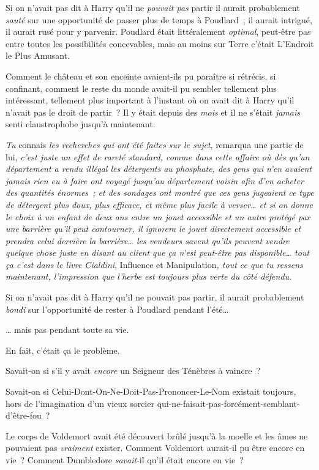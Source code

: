 Si on n'avait pas dit à Harry qu'il ne \emph{pouvait pas} partir il aurait probablement \emph{sauté} sur une opportunité de passer plus de temps à Poudlard~; il aurait intrigué, il aurait rusé pour y parvenir.
Poudlard était littéralement \emph{optimal}, peut-être pas entre toutes les possibilités concevables, mais au moins sur Terre c'était L'Endroit le Plus Amusant.

Comment le château et son enceinte avaient-ils pu paraître si rétrécis, si confinant, comment le reste du monde avait-il pu sembler tellement plus intéressant, tellement plus important à l'instant où on avait dit à Harry qu'il n'avait pas le droit de partir~?
Il y était depuis des \emph{mois} et il ne s'était \emph{jamais} senti claustrophobe jusqu'à maintenant.

\emph{Tu} connais \emph{les recherches qui ont été faites sur le sujet}, remarqua une partie de lui, \emph{c'est juste un effet de rareté standard, comme dans cette affaire où dès qu'un département a rendu illégal les détergents au phosphate, des gens qui n'en avaient jamais rien eu à faire ont voyagé jusqu'au département voisin afin d'en acheter des quantités énormes~; et des sondages ont montré que ces gens jugeaient ce type de détergent plus doux, plus efficace, et même plus facile à verser… et si on donne le choix à un enfant de deux ans entre un jouet accessible et un autre protégé par une barrière qu'il peut contourner, il ignorera le jouet directement accessible et prendra celui derrière la barrière… les vendeurs savent qu'ils peuvent vendre quelque chose juste en disant au client que ça n'est peut-être pas disponible… tout ça c'est dans le livre Cialdini}, Influence et Manipulation\emph{, tout ce que tu ressens maintenant, l'impression que l'herbe est toujours plus verte du côté défendu.}

Si on n'avait pas dit à Harry qu'il ne pouvait pas partir, il aurait probablement \emph{bondi} sur l'opportunité de rester à Poudlard pendant l'été…

… mais pas pendant toute sa vie.

En fait, c'était ça le problème.

Savait-on si s'il y avait \emph{encore} un Seigneur des Ténèbres à vaincre~?

Savait-on si Celui-Dont-On-Ne-Doit-Pas-Prononcer-Le-Nom existait toujours, hors de l'imagination d'un vieux sorcier qui-ne-faisait-pas-forcément-semblant-d'être-fou~?

Le corps de Voldemort avait été découvert brûlé jusqu'à la moelle et les âmes ne pouvaient pas \emph{vraiment} exister.
Comment Voldemort aurait-il pu être encore en vie~?
Comment Dumbledore \emph{savait}-il qu'il était encore en vie~?

